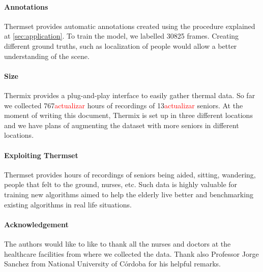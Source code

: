 \documentclass[oneside, twocolumn]{article}
\newcommand\myworries[1]{\textcolor{red}{#1}}
\begin{document}
\paragraph{Annotations}
Thermset provides automatic annotations created using the procedure explained at \autoref{sec:application}. To train the model, we labelled 30825 frames. Creating different ground truths, such as localization of people would allow a better understanding of the scene.
\paragraph{Size}
Thermix provides a plug-and-play interface to easily gather thermal data. So far we collected 767\myworries{actualizar} hours of recordings of 13\myworries{actualizar} seniors. At the moment of writing this document, Thermix is set up in three different locations and we have plans of augmenting the dataset with more seniors in different locations.

\paragraph{Exploiting Thermset}
Thermset provides hours of recordings of seniors being aided, sitting, wandering, people that felt to the ground, nurses, etc. Such data is highly valuable for training new algorithms aimed to help the elderly live better and benchmarking existing algorithms in real life situations.
\paragraph{Acknowledgement}
The authors would like to like to thank all the nurses and doctors at the healthcare facilities from where we collected the data. Thank also Professor Jorge Sanchez from National University of C\'ordoba for his helpful remarks.

\end{document}
